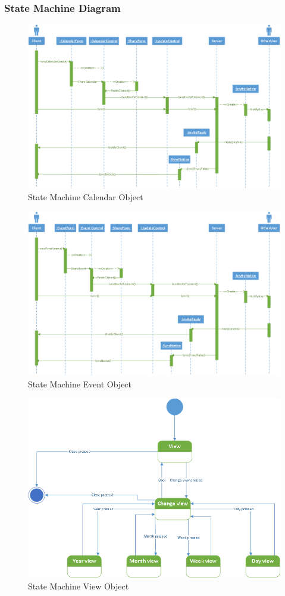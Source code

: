 \newpage
\subsubsection*{State Machine Diagram}
\begin{figure}[ht!]
\centering
\includegraphics[width=160mm]{Figures/SequenceDiagramCalendarWorkflow.png}
\caption{State Machine Calendar Object  \label{overflow}}
\end{figure}

\begin{figure}[ht!]
\centering
\includegraphics[width=160mm]{Figures/SequenceDiagramEventWorkflow.png}
\caption{State Machine Event Object \label{overflow}}
\end{figure}

\newpage
\begin{figure}[ht!]
\centering
\includegraphics[width=160mm]{Figures/SequenceDiagramViewWorkflow.png}
\caption{State Machine View Object  \label{overflow}}
\end{figure}